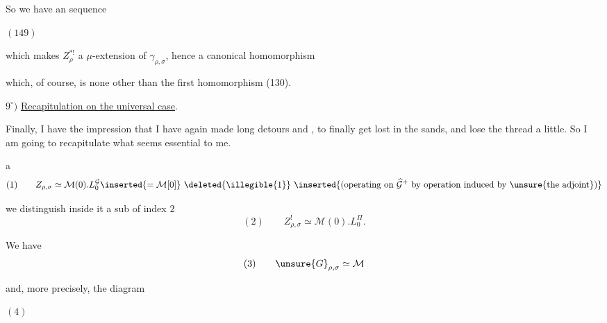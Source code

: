 
So we have an  sequence

\( (149) \)\quad
{}

which makes $Z_\rho^{*!}$ a $\mu$-extension of $\gamma_{\rho,\sigma}$,
hence a canonical homomorphism


which, of course, is none other than the first homomorphism (130).

$9^\circ)$ \uline{Recapitulation on the universal case}.

Finally, I have the impression that I have again made long detours and
, to finally get lost in the sands, and lose
the thread a little. So I am going to recapitulate what seems essential to me.

\textcircled{a}
\[
(1)\qquad Z_{\rho,\sigma}\simeq\mathcal M(0).L_0^{\mathcal G}
\inserted{=\mathcal M[0]}\ \deleted{\illegible{1}}\ \inserted{
\text{(operating on }\widehat{\mathcal G}^{+}\text{ by operation induced by }\unsure{\text{the adjoint}}\text{)}}
\]

we distinguish inside it a sub of index $2$
\[
(2)\qquad Z_{\rho,\sigma}^{!}\simeq\mathcal M(0).L_0^{\Pi}.
\]


We have
\[
(3)\qquad \unsure{G}_{\rho,\sigma}\simeq\mathcal M
\]

and,  more precisely, the diagram

\( (4) \)\quad
{}

